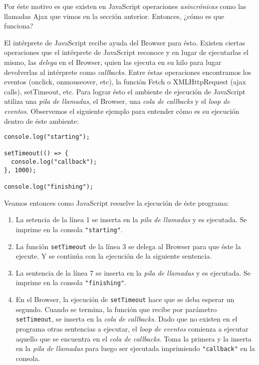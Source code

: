 \documentclass[a4paper, oneside, titlepage, 12pt]{paper}
\begin{document}
Por éste motivo es que existen en JavaScript operaciones \textit{asincrónicas} como las llamadas Ajax que vimos en la sección anterior. Entonces, ¿cómo es que funciona?
\newline

El intérprete de JavaScript recibe ayuda del Browser para ésto. Existen ciertas operaciones que el intérprete de JavaScript reconoce y en lugar de ejecutarlas el mismo, las \textit{delega} en el Browser, quien las ejecuta en su hilo para lugar devolverlas al intérprete como \textit{callbacks}. Entre éstas operaciones encontramos los eventos (onclick, onmouseover, etc), la función Fetch o XMLHttpRequest (ajax calls), setTimeout, etc. Para lograr ésto el ambiente de ejecución de JavaScript utiliza una \textit{pila de llamadas}, el Browser, una \textit{cola de callbacks} y el \textit{loop de eventos}. Observemos el siguiente ejemplo para entender cómo es su ejecución dentro de éste ambiente:

\begin{verbatim}
console.log("starting");

setTimeout(() => {
  console.log("callback");
}, 1000);

console.log("finishing");
\end{verbatim}

Veamos entonces como JavaScript resuelve la ejecución de éste programa:
\begin{enumerate}
\item La setencia de la línea 1 se inserta en la \textit{pila de llamadas} y es ejecutada. Se imprime en la consola \texttt{"starting"}. 
\item La función \texttt{setTimeout} de la línea 3 se delega al Browser para que éste la ejecute. Y se continúa con la ejecución de la siguiente sentencia.
\item La sentencia de la línea 7 se inserta en la \textit{pila de llamadas} y es ejecutada. Se imprime en la consola \texttt{"finishing"}.
\item En el Browser, la ejecución de \texttt{setTimeout} hace que se deba esperar un segundo. Cuando se termina, la función que recibe por parámetro \texttt{setTimeout}, se inserta en la \textit{cola de callbacks}. Dado que no existen en el programa otras sentencias a ejecutar, el \textit{loop de eventos} comienza a ejecutar aquello que se encuentra en el \textit{cola de callbacks}. Toma la primera y la inserta en la \textit{pila de llamadas} para luego ser ejecutada imprimiendo \texttt{"callback"} en la consola.
\end{enumerate}
\end{document}
